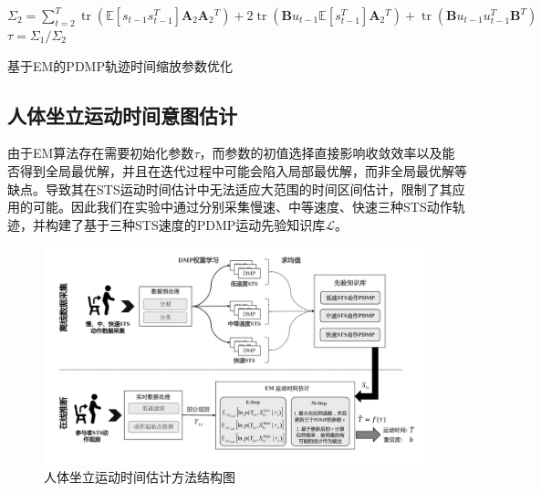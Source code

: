 \begin{algorithm}[h]
{{{            $\Sigma_2=\sum_{t=2}^T \operatorname{tr}\left(\mathbb{E}\left[s_{t-1} s_{t-1}^T\right] \mathbf{A}_2 \mathbf{A}_2{ }^T\right)+2 \operatorname{tr}\left(\mathbf{B} u_{t-1} \mathbb{E}\left[s_{t-1}^T\right] \mathbf{A}_2{ }^T\right)+\operatorname{tr}\left(\mathbf{B} u_{t-1} u_{t-1}^T \mathbf{B}^T\right)$
        }
        $\tau=\Sigma_1 / \Sigma_2$ \;
      }
    }
    \caption{基于EM的PDMP轨迹时间缩放参数优化}
    \label{algo:4-1}
  \end{algorithm}

\subsection{人体坐立运动时间意图估计}
由于EM算法存在需要初始化参数$\tau$，而参数的初值选择直接影响收敛效率以及能否得到全局最优解，并且在迭代过程中可能会陷入局部最优解，而非全局最优解等缺点。导致其在STS运动时间估计中无法适应大范围的时间区间估计，限制了其应用的可能。因此我们在实验中通过分别采集慢速、中等速度、快速三种STS动作轨迹，并构建了基于三种STS速度的PDMP运动先验知识库$\mathscr{L}$。

\begin{figure}[htb]
    \centering\includegraphics[width=1\textwidth]{figures/4-Fig-3.pdf}
    \caption{人体坐立运动时间估计方法结构图}
    \label{fig:4-3}
\end{figure}

